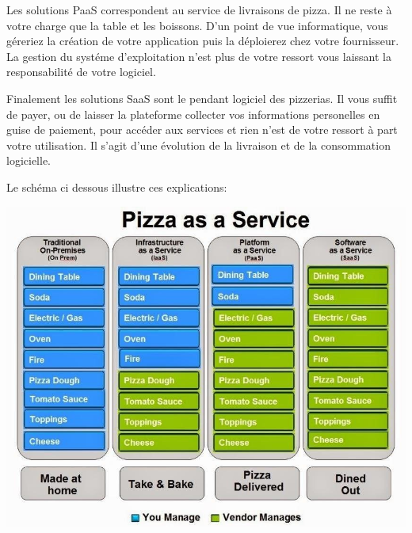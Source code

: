 \documentclass[11pt, a4paper ]{article}
\begin{document}
\begin{spacing}{1.5}
Les solutions PaaS correspondent au service de livraisons de pizza. Il ne reste à votre charge que la table et les boissons. D'un point de vue informatique, vous géreriez la création de votre application puis la déploierez chez votre fournisseur. La gestion du systéme d'exploitation n'est plus de votre ressort vous laissant la responsabilité de votre logiciel.

Finalement les solutions SaaS sont le pendant logiciel des pizzerias. Il vous suffit de payer, ou de laisser la plateforme collecter vos informations personelles en guise de paiement, pour accéder aux services et rien n'est de votre ressort à part votre utilisation. Il s'agit d'une évolution de la livraison et de la consommation logicielle.

Le schéma ci dessous illustre ces explications:

\includegraphics[width=\textwidth]{images/PizzaasaService.jpg}



\end{spacing}
\end{document}
